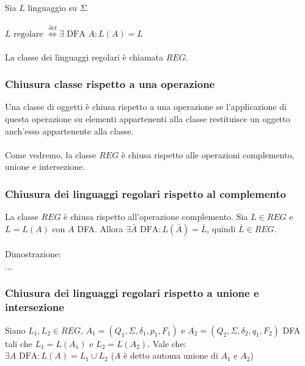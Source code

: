 \documentclass[]{article}
\begin{document}
Sia \mbox{$ L $} linguaggio su \mbox{$ \Sigma $}.
\\
\\
\mbox{$ L \text{ regolare }
\overset{\text{def}}{\Leftrightarrow}
\exists \text{ DFA } A \colon L(A) = L $}
\\
\\
La classe dei linguaggi regolari è chiamata \mbox{$ REG $}.



\subsubsection{Chiusura classe rispetto a una operazione}

Una classe di oggetti è chiusa rispetto a una operazione se l'applicazione di questa operazione su
elementi appartenenti alla classe restituisce un oggetto anch'esso appartenente alla classe.
\\
\\
Come vedremo, la classe \mbox{$ REG $} è chiusa rispetto alle operazioni complemento, unione
e intersezione.



\subsubsection{Chiusura dei linguaggi regolari rispetto al complemento}

La classe \mbox{$ REG $} è chiusa rispetto all'operazione complemento. Sia \mbox{$ L \in REG $} e
\mbox{$ L = L(A) $} con \mbox{$ A $} DFA. Allora
\mbox{$ \exists \bar{A} \text{ DFA} \colon L(\bar{A}) = \bar{L} $}, quindi
\mbox{$ \bar{L} \in REG $}.
\\
\\
Dimostrazione:
\\
...



\newpage
\subsubsection{Chiusura dei linguaggi regolari rispetto a unione e intersezione}

Siano \mbox{$ L_1, L_2 \in REG $},
\mbox{$ A_1 = (Q_1, \Sigma, \delta_1, p_1, F_1) $} e
\mbox{$ A_2 = (Q_2, \Sigma, \delta_2, q_1, F_2) $}
DFA tali che \mbox{$ L_1 = L(A_1) $} e
\mbox{$ L_2 = L(A_2) $}. Vale che:
\\

\mbox{$ \exists A \text{ DFA} \colon L(A) = L_1 \cup L_2 $} (\mbox{$ A $} è detto automa unione di \mbox{$ A_1 $} e \mbox{$ A_2 $})
\end{document}

